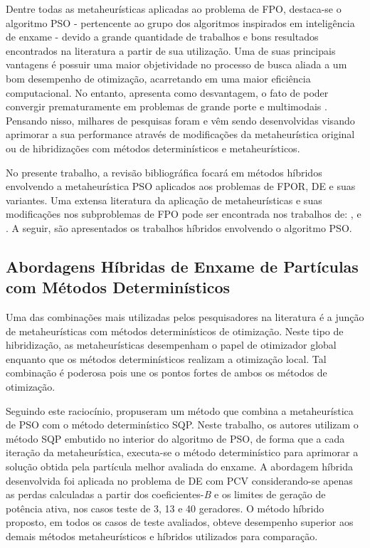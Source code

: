 \documentclass[
	12pt,				%
	openany,			%
	twoside,			%
	a4paper,			%
	chapter=TITLE,		%
	section=Title,		%
	subsection=Title,	%
	subsubsection=Title,%
	english,			%
	french,				%
	spanish,			%
	brazil			%
	]{abntex2}
\begin{document}
\begin{ERRATA}
\begin{itemize}
\end{itemize}

Dentre todas as metaheurísticas aplicadas ao problema de FPO, destaca-se o algoritmo PSO - pertencente ao grupo dos algoritmos inspirados em inteligência de enxame - devido a grande quantidade de trabalhos e bons resultados encontrados na literatura a partir de sua utilização. Uma de suas principais vantagens é possuir uma maior objetividade no processo de busca aliada a um bom desempenho de otimização, acarretando em uma maior eficiência computacional. No entanto, apresenta como desvantagem, o fato de poder convergir prematuramente em problemas de grande porte e multimodais \cite{clpso}. Pensando nisso, milhares de pesquisas foram e vêm sendo desenvolvidas visando aprimorar a sua performance através de modificações da metaheurística original ou de hibridizações com métodos determinísticos e metaheurísticos. 

No presente trabalho, a revisão bibliográfica focará em métodos híbridos envolvendo a metaheurística PSO aplicados aos problemas de FPOR, DE e suas variantes. Uma extensa literatura da aplicação de metaheurísticas e suas modificações nos subproblemas de FPO pode ser encontrada nos trabalhos de: ,  e . A seguir, são apresentados os trabalhos híbridos envolvendo o algoritmo PSO.

\subsection{Abordagens Híbridas de Enxame de Partículas com Métodos Determinísticos}

Uma das combinações mais utilizadas pelos pesquisadores na literatura é a junção de metaheurísticas com métodos determinísticos de otimização. Neste tipo de hibridização, as metaheurísticas desempenham o papel de otimizador global enquanto que os métodos determinísticos realizam a otimização local. Tal combinação é poderosa pois une os pontos fortes de ambos os métodos de otimização.

Seguindo este raciocínio,  propuseram um método que combina a metaheurística de PSO com o método determinístico SQP. Neste trabalho, os autores utilizam o método SQP embutido no interior do algoritmo de PSO, de forma que a cada iteração da metaheurística, executa-se o método determinístico para aprimorar a solução obtida pela partícula melhor avaliada do enxame. A abordagem híbrida desenvolvida foi aplicada no problema de DE com PCV considerando-se apenas as perdas calculadas a partir dos coeficientes-\emph{B} e os limites de geração de potência ativa, nos casos teste de 3, 13 e 40 geradores. O método híbrido proposto, em todos os casos de teste avaliados, obteve desempenho superior aos demais métodos metaheurísticos e híbridos utilizados para comparação. 


\end{ERRATA}
\end{document}
